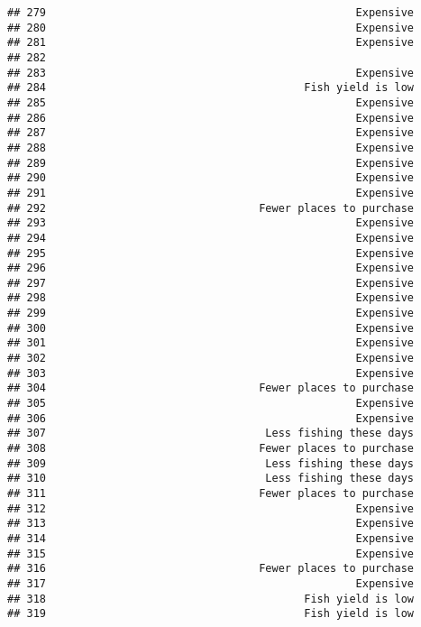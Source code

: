 \documentclass[
]{article}
\begin{document}
\begin{verbatim}
## 279                                                Expensive
## 280                                                Expensive
## 281                                                Expensive
## 282                                                         
## 283                                                Expensive
## 284                                        Fish yield is low
## 285                                                Expensive
## 286                                                Expensive
## 287                                                Expensive
## 288                                                Expensive
## 289                                                Expensive
## 290                                                Expensive
## 291                                                Expensive
## 292                                 Fewer places to purchase
## 293                                                Expensive
## 294                                                Expensive
## 295                                                Expensive
## 296                                                Expensive
## 297                                                Expensive
## 298                                                Expensive
## 299                                                Expensive
## 300                                                Expensive
## 301                                                Expensive
## 302                                                Expensive
## 303                                                Expensive
## 304                                 Fewer places to purchase
## 305                                                Expensive
## 306                                                Expensive
## 307                                  Less fishing these days
## 308                                 Fewer places to purchase
## 309                                  Less fishing these days
## 310                                  Less fishing these days
## 311                                 Fewer places to purchase
## 312                                                Expensive
## 313                                                Expensive
## 314                                                Expensive
## 315                                                Expensive
## 316                                 Fewer places to purchase
## 317                                                Expensive
## 318                                        Fish yield is low
## 319                                        Fish yield is low

\end{verbatim}
\end{document}
